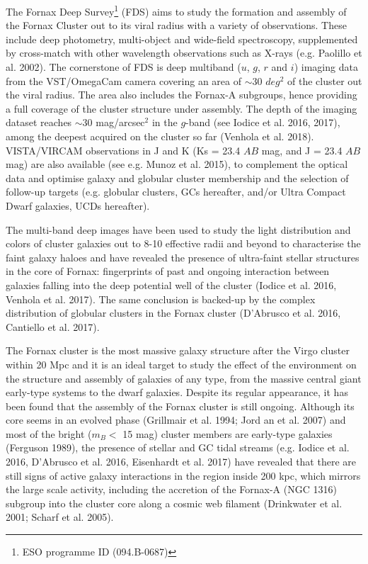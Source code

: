 \documentclass[useAMS,usenatbib]{mn2e}
\begin{document}
The Fornax Deep Survey\footnote{ESO programme ID (094.B-0687)} (FDS) aims to study the formation and assembly of the Fornax Cluster out to its viral radius with a variety of observations. These include
deep photometry, multi-object and wide-field spectroscopy, supplemented by cross-match with other wavelength observations such as  X-rays (e.g. Paolillo et al. 2002).
The cornerstone of FDS is deep multiband ($u$, $g$, $r$ and $i$) imaging data from the VST/OmegaCam camera covering an area of $\sim30$ $deg^2$ of the cluster out the viral radius. The area also includes the Fornax-A subgroups, hence providing a full coverage of the cluster structure under assembly.  The depth of the imaging dataset reaches $\sim 30$ mag/arcsec$^2$ in the $g$-band (see Iodice et al. 2016, 2017), among the deepest acquired on the cluster so far (Venhola et al. 2018). VISTA/VIRCAM observations in J and K (Ks = 23.4 $AB$ mag, and J = 23.4 $AB$ mag) are also available (see e.g. Munoz et al. 2015), to complement the optical data and optimise galaxy and globular cluster membership and the selection of follow-up targets (e.g. globular clusters, GCs hereafter, and/or Ultra Compact Dwarf galaxies, UCDs hereafter). 

The multi-band deep images have been used to study the light distribution and colors of cluster galaxies out to 8-10 effective radii and beyond to characterise the faint galaxy haloes and have revealed the presence of ultra-faint stellar structures in the core of Fornax: fingerprints of past and ongoing interaction between galaxies falling into the deep potential well of the cluster (Iodice et al. 2016, Venhola et al. 2017). The same conclusion is backed-up by the complex distribution of globular clusters in the Fornax cluster (D’Abrusco et al. 2016, Cantiello et al. 2017).

The Fornax cluster is the most massive galaxy structure after the Virgo cluster within 20 Mpc and it is an ideal target to study the effect of the environment on the structure and assembly of galaxies of any type, from the massive central giant early-type systems to the dwarf galaxies. Despite its regular appearance, it has been found that the assembly of the Fornax cluster is still ongoing. Although its core seems in an evolved phase (Grillmair et al. 1994; Jord an et al. 2007) and most of the bright ($m_B < $  15 mag) cluster members are early-type galaxies (Ferguson 1989), the presence of stellar and GC tidal streams (e.g. Iodice et al. 2016, D’Abrusco et al. 2016, Eisenhardt et al. 2017) have revealed that there are still signs of active galaxy interactions in the region inside 200 kpc, which mirrors the large scale activity, including the accretion of the Fornax-A (NGC 1316) subgroup into the cluster core along a cosmic web filament (Drinkwater et al. 2001; Scharf et al. 2005).
\end{document}
